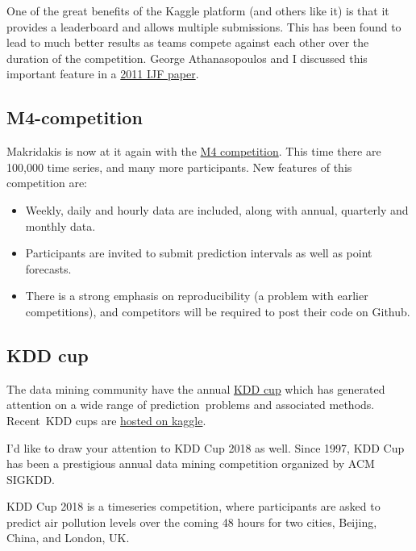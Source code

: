 \documentclass[11pt,a4paper,]{article}
\providecommand{\tightlist}{%
  \setlength{\itemsep}{0pt}\setlength{\parskip}{0pt}}
\begin{document}
One of the great benefits of the Kaggle platform (and others like it) is that it provides a leaderboard and allows multiple submissions. This has been found to lead to much better results as teams compete against each other over the duration of the competition. George Athanasopoulos and I discussed this important feature in a \href{/publications/kaggle/}{2011 IJF paper}.

\hypertarget{m4-competition}{%
\subsection*{M4-competition}\label{m4-competition}}

Makridakis is now at it again with the \href{https://www.m4.unic.ac.cy/}{M4 competition}. This time there are 100,000 time series, and many more participants. New features of this competition are:

\begin{itemize}
\tightlist
\item
  Weekly, daily and hourly data are included, along with annual, quarterly and monthly data.
\item
  Participants are invited to submit prediction intervals as well as point forecasts.
\item
  There is a strong emphasis on reproducibility (a problem with earlier competitions), and competitors will be required to post their code on Github.
\end{itemize}

\hypertarget{kdd-cup}{%
\subsection{KDD cup}\label{kdd-cup}}

The data mining community have the annual \href{http://kdd.org/kdd-cup}{KDD cup} which has generated attention on a wide range of prediction~problems and associated methods. Recent~KDD cups are \href{https://www.kaggle.com/c/kdd-cup-2014-predicting-excitement-at-donors-choose}{hosted on kaggle}.

I'd like to draw your attention to KDD Cup 2018 as well. Since 1997, KDD Cup has been a prestigious annual data mining competition organized by ACM SIGKDD.

KDD Cup 2018 is a timeseries competition, where participants are asked to predict air pollution levels over the coming 48 hours for two cities, Beijing, China, and London, UK.
\end{document}
